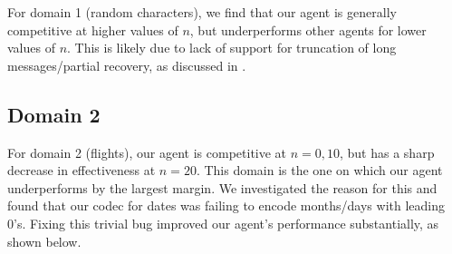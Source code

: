\documentclass[titlepage]{article}
\begin{document}
For domain 1 (random characters), we find that our agent is generally competitive at higher values of $n$, but underperforms other agents for lower values of $n$. This is likely due to lack of support for truncation of long messages/partial recovery, as discussed in .

\subsection{Domain 2}

For domain 2 (flights), our agent is competitive at $n=0, 10$, but has a sharp decrease in effectiveness at $n=20$. This domain is the one on which our agent underperforms by the largest margin. We investigated the reason for this and found that our codec for dates was failing to encode months/days with leading 0's. Fixing this trivial bug improved our agent's performance substantially, as shown below.

\end{document}
